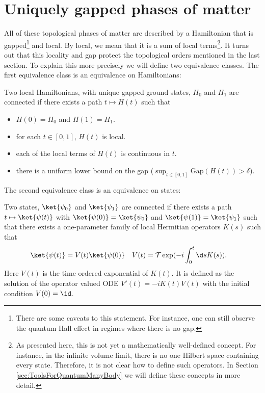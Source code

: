 \section{Uniquely gapped phases of matter}\label{sec:GappedPhasesOfMatterIntro}
All of these topological phases of matter are described by a Hamiltonian that is gapped\footnote{There are some caveats to this statement. For instance, one can still observe the quantum Hall effect in regimes where there is no gap.} and local. By local, we mean that it is a sum of local terms\footnote{As presented here, this is not yet a mathematically well-defined concept. For instance, in the infinite volume limit, there is no one Hilbert space containing every state. Therefore, it is not clear how to define such operators. In Section \ref{sec:ToolsForQuantumManyBody} we will define these concepts in more detail.}. It turns out that this locality and gap protect the topological orders mentioned in the last section. To explain this more precisely we will define two equivalence classes. The first equivalence class is an equivalence on Hamiltonians:
\begin{definition}\label{def:ConnectedHamiltonians}
	Two local Hamiltonians, with unique gapped ground states, $H_0$ and $H_1$ are connected if there exists a path $t\mapsto H(t)$ such that
	\begin{itemize}
		\item $H(0)=H_0$ and $H(1)=H_1$.
		\item for each $t\in[0,1]$, $H(t)$ is local.
		\item each of the local terms of $H(t)$ is continuous in $t$.
		\item there is a uniform lower bound on the gap ($\sup_{t\in[0,1]}\textrm{Gap}(H(t))>\delta$).
	\end{itemize}
\end{definition}
The second equivalence class is an equivalence on states:
\begin{definition}\label{def:ConnectedStates}
	Two states, $\ket{\psi_0}$ and $\ket{\psi_1}$ are connected if there exists a path $t\mapsto \ket{\psi(t)}$ with $\ket{\psi(0)}=\ket{\psi_0}$ and $\ket{\psi(1)}=\ket{\psi_1}$ such that there exists a one-parameter family of local Hermitian operators $K(s)$ such that
	\begin{align}
	\ket{\psi(t)}&=V(t)\ket{\psi(0)}&V(t)&=\mathcal{T}\exp(-i\int_{0}^{t}\d s K(s)).
	\end{align}
	Here $V(t)$ is the time ordered exponential of $K(t)$. It is defined as the solution of the operator valued ODE $V'(t)=-iK(t)V(t)$ with the initial condition $V(0)=\id$.
\end{definition}
